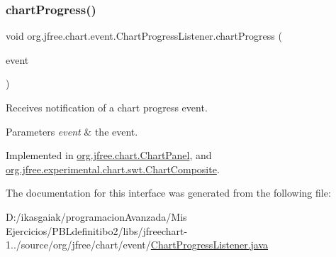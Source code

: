 \subsubsection{\texorpdfstring{chart\+Progress()}{chartProgress()}}
{\footnotesize\ttfamily void org.\+jfree.\+chart.\+event.\+Chart\+Progress\+Listener.\+chart\+Progress (\begin{DoxyParamCaption}\item[{\mbox{\hyperlink{classorg_1_1jfree_1_1chart_1_1event_1_1_chart_progress_event}{Chart\+Progress\+Event}}}]{event }\end{DoxyParamCaption})}

Receives notification of a chart progress event.


\begin{DoxyParams}{Parameters}
{\em event} & the event. \\
\hline
\end{DoxyParams}


Implemented in \mbox{\hyperlink{classorg_1_1jfree_1_1chart_1_1_chart_panel_ab523b864bdd86dbe34cbc9c39a8b3763}{org.\+jfree.\+chart.\+Chart\+Panel}}, and \mbox{\hyperlink{classorg_1_1jfree_1_1experimental_1_1chart_1_1swt_1_1_chart_composite_a1cb57ed2b46ce82a5da55e2d44ff6cdd}{org.\+jfree.\+experimental.\+chart.\+swt.\+Chart\+Composite}}.



The documentation for this interface was generated from the following file\+:\begin{DoxyCompactItemize}
\item 
D\+:/ikasgaiak/programacion\+Avanzada/\+Mis Ejercicios/\+P\+B\+Ldefinitibo2/libs/jfreechart-\/1../source/org/jfree/chart/event/\mbox{\hyperlink{_chart_progress_listener_8java}{Chart\+Progress\+Listener.\+java}}\end{DoxyCompactItemize}
